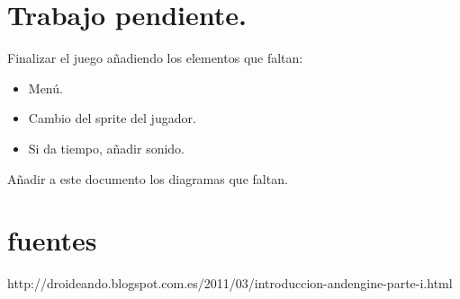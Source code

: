 \documentclass[12 pt, a4paper, twoside]{article}
\begin{document}
\clearpage



\section{Trabajo pendiente.}

Finalizar el juego añadiendo los elementos que faltan:

\begin{itemize}
  \item Menú.
  \item Cambio del sprite del jugador.
  \item Si da tiempo, añadir sonido.
\end{itemize}

Añadir a este documento los diagramas que faltan.





\section{fuentes}
http://droideando.blogspot.com.es/2011/03/introduccion-andengine-parte-i.html
\end{document}
